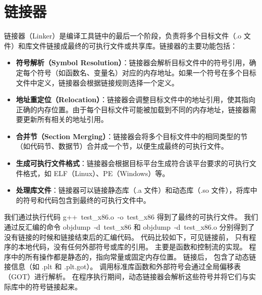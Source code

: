 \documentclass[UTF8,a4paper,10pt]{ctexart}
\begin{document}
\section{链接器}
链接器（Linker）是编译工具链中的最后一个阶段，负责将多个目标文件（.o 文件）和库文件链接成最终的可执行文件或共享库。链接器的主要功能包括： 
\begin{itemize}
    \item \textbf{符号解析（Symbol Resolution）}：链接器会解析目标文件中的符号引用，确定每个符号（如函数名、变量名）对应的内存地址。如果一个符号在多个目标文件中定义，链接器会根据链接规则选择一个定义。
    \item \textbf{地址重定位（Relocation）}：链接器会调整目标文件中的地址引用，使其指向正确的内存位置。由于每个目标文件可能被加载到不同的内存地址，链接器需要更新所有相关的地址引用。
    \item \textbf{合并节（Section Merging）}：链接器会将多个目标文件中的相同类型的节（如代码节、数据节）合并成一个节，以便生成最终的可执行文件。
    \item \textbf{生成可执行文件格式}：链接器会根据目标平台生成符合该平台要求的可执行文件格式，如 ELF（Linux）、PE（Windows）等。 
    \item \textbf{处理库文件}：链接器可以链接静态库（.a 文件）和动态库（.so 文件），将库中的符号和代码包含到最终的可执行文件中。
\end{itemize}
我们通过执行代码  g++\ test\_x86.o\ -o\ test\_x86   得到了最终的可执行文件。
我们通过反汇编的命令 objdump\ -d\ test\_x86  和  objdump\ -d\ test\_x86.o  分别得到了没有链接的时候和链接结束后的汇编代码。 
代码比较如下，可见链接前，
只有程序的本地代码，没有任何外部符号或库的引用。
主要是函数和控制流的实现。
程序中的所有操作都是静态的，指向常量或固定内存位置。
链接后，
包含了动态链接信息（如 .plt 和 .plt.got）。
调用标准库函数和外部符号会通过全局偏移表（GOT）进行解析。
在程序执行期间，动态链接器会解析这些符号并将它们与实际库中的符号链接起来。
\end{document}
